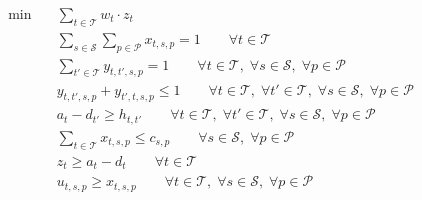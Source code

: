 \begin{align}
  \min\quad & \sum_{t \in \mathcal{T}} w_{t} \cdot z_{t} \tag{passenger\_inconvenience} \\
  & \sum_{s \in \mathcal{S}} \sum_{p \in \mathcal{P}} x_{t,s,p} = 1 \qquad \forall t \in \mathcal{T} \tag{train\_assignment} \\
  & \sum_{t' \in \mathcal{T}} y_{t,t',s,p} = 1 \qquad \forall t \in \mathcal{T},\; \forall s \in \mathcal{S},\; \forall p \in \mathcal{P} \tag{train\_ordering} \\
  & y_{t,t',s,p} + y_{t',t,s,p} \le 1 \qquad \forall t \in \mathcal{T},\; \forall t' \in \mathcal{T},\; \forall s \in \mathcal{S},\; \forall p \in \mathcal{P} \tag{train\_ordering} \\
  & a_{t} - d_{t'} \ge h_{t,t'} \qquad \forall t \in \mathcal{T},\; \forall t' \in \mathcal{T},\; \forall s \in \mathcal{S},\; \forall p \in \mathcal{P} \tag{headway\_constraint} \\
  & \sum_{t \in \mathcal{T}} x_{t,s,p} \le c_{s,p} \qquad \forall s \in \mathcal{S},\; \forall p \in \mathcal{P} \tag{platform\_capacity} \\
  & z_{t} \ge a_{t} - d_{t} \qquad \forall t \in \mathcal{T} \tag{retiming\_constraint} \\
  & u_{t,s,p} \ge x_{t,s,p} \qquad \forall t \in \mathcal{T},\; \forall s \in \mathcal{S},\; \forall p \in \mathcal{P} \tag{local\_rerouting} \\
\end{align}